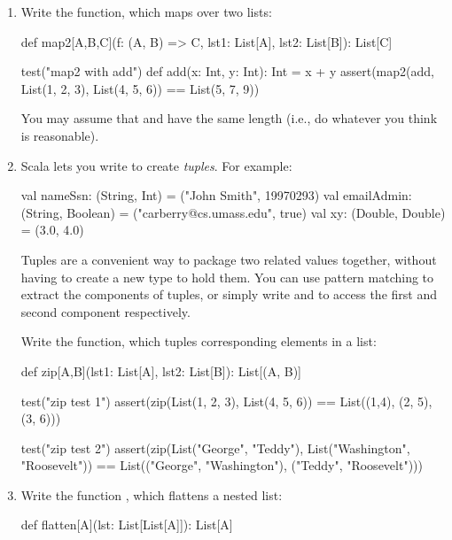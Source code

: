 \documentclass{book}
\begin{document}
\begin{enumerate}

\item
Write the  function, which maps over two lists:

\begin{scalacode}
def map2[A,B,C](f: (A, B) => C, lst1: List[A], lst2: List[B]): List[C]

test("map2 with add") {
  def add(x: Int, y: Int): Int = x + y
  assert(map2(add, List(1, 2, 3), List(4, 5, 6)) == List(5, 7, 9))
}
\end{scalacode}

You may assume that  and  have the same
length (i.e., do whatever you think is reasonable).

\item
Scala lets you write  to create \emph{tuples}. For example:

\begin{scalacode}
val nameSsn: (String, Int) = ("John Smith", 19970293)
val emailAdmin: (String, Boolean) = ("carberry@cs.umass.edu", true)
val xy: (Double, Double) = (3.0, 4.0)
\end{scalacode}

Tuples are a convenient way to package two related values together, without
having to create a new type to hold them. You can use pattern matching to
extract the components of tuples, or simply write 
and  to access the first and second component respectively.

Write the  function, which tuples corresponding elements in a list:

\begin{scalacode}
def zip[A,B](lst1: List[A], lst2: List[B]): List[(A, B)]

test("zip test 1") {
  assert(zip(List(1, 2, 3), List(4, 5, 6)) == List((1,4), (2, 5), (3, 6)))
}

test("zip test 2") {
  assert(zip(List("George", "Teddy"), List("Washington", "Roosevelt")) ==
         List(("George", "Washington"), ("Teddy", "Roosevelt")))
}
\end{scalacode}

\item
Write the function , which flattens a nested list:

\begin{scalacode}
def flatten[A](lst: List[List[A]]): List[A]


\end{scalacode}
\end{enumerate}
\end{document}
